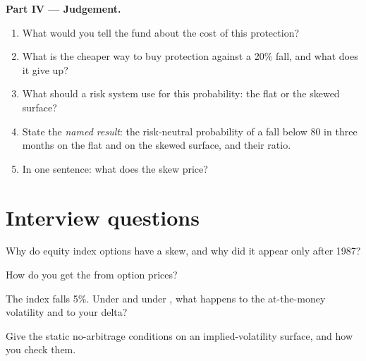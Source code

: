 \begin{problem}
\medskip\noindent\textbf{Part IV --- Judgement.}
\begin{enumerate}[resume]
\item What would you tell the fund about the cost of this protection?
\item What is the cheaper way to buy protection against a 20\% fall, and what does it give up?
\item What should a risk system use for this probability: the flat or the skewed surface?
\item State the \emph{named result}: the risk-neutral probability of a fall below 80 in three
months on the flat and on the skewed surface, and their ratio.
\item In one sentence: what does the skew price?
\end{enumerate}
\end{problem}

\section{Interview questions}

\begin{interviewq}\label{iq:dv:implied-volatility-and-its-surface:1}
Why do equity index options have a skew, and why did it appear only after 1987?
\end{interviewq}

\begin{interviewq}\label{iq:dv:implied-volatility-and-its-surface:2}
How do you get the  from option prices?
\end{interviewq}

\begin{interviewq}\label{iq:dv:implied-volatility-and-its-surface:3}
The index falls 5\%. Under  and under , what happens to the
at-the-money volatility and to your delta?
\end{interviewq}

\begin{interviewq}\label{iq:dv:implied-volatility-and-its-surface:4}
Give the static no-arbitrage conditions on an implied-volatility surface, and how you check
them.
\end{interviewq}

